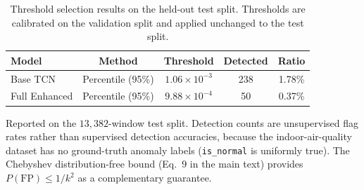 \begin{table}[htbp]
\centering
\caption{Threshold selection results on the held-out test split. Thresholds are calibrated on the validation split and applied unchanged to the test split.}
\label{table:threshold_comparison}
\begin{tabular}{lcccc}
\toprule
\textbf{Model} & \textbf{Method} & \textbf{Threshold} & \textbf{Detected} & \textbf{Ratio} \\
\midrule
Base TCN          & Percentile (95\%) & $1.06\times 10^{-3}$ & 238 & 1.78\% \\
Full Enhanced     & Percentile (95\%) & $9.88\times 10^{-4}$ & 50  & 0.37\% \\
\bottomrule
\end{tabular}
\begin{flushleft}
\footnotesize Reported on the $13{,}382$-window test split. Detection counts are unsupervised flag rates rather than supervised detection accuracies, because the indoor-air-quality dataset has no ground-truth anomaly labels (\texttt{is\_normal} is uniformly true). The Chebyshev distribution-free bound (Eq.~9 in the main text) provides $P(\text{FP})\leq 1/k^2$ as a complementary guarantee.
\end{flushleft}
\end{table}
